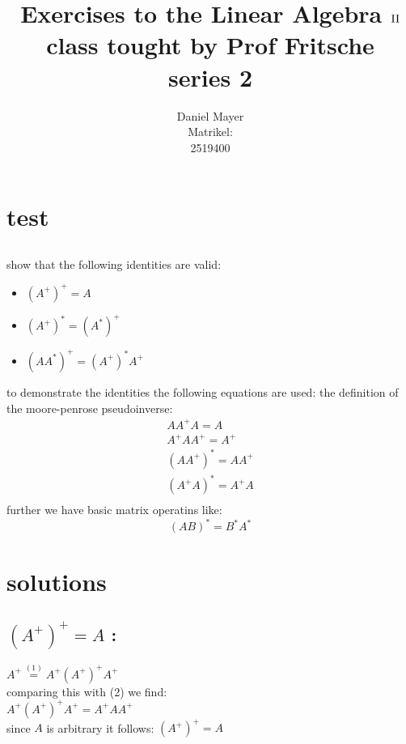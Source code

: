 \documentclass[a4paper,10pt]{article}
\title{Exercises to the Linear Algebra $\RN{2}$ class tought by Prof Fritsche\\
series 2}
\author{Daniel Mayer\\
Matrikel:\\
2519400}
\begin{document}
\section{test}

\setcounter{section}{1}
\subsection{}
show that the following identities are valid:
\begin{itemize}
	\item $ (A^+)^+=A$
	\item $ (A^+)^*=(A^*)^+$
	\item $ (AA^*)^+=(A^+)^*A^+$
		
\end{itemize}
to demonstrate the identities the following equations are used:
the definition of the moore-penrose pseudoinverse:
\begin{align}
	A A^+ A = A \\
	A^+ A A^+ = A^+ \\
	(A A^+)^* = A A^+ \\
	(A^+ A)^*=A^+ A \\
\end{align}
further we have basic matrix operatins like:
\begin{equation}
	(AB)^*=B^*A^*
\end{equation}
\section*{solutions}
\subsection*{$(A^+)^+=A$ :}
$A^+\stackrel{(1)}{=} A^+(A^+)^+A^+$\\
comparing this  with (2) we find:\\
$ A^+(A^+)^+A^+ = A^+AA^+$\\
since $A$ is arbitrary it follows: $(A^+)^+=A$
\end{document}
